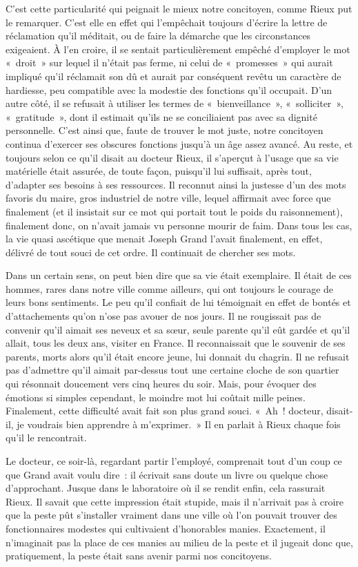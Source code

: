 \documentclass[french,twoside]{book} %
\begin{document}
C’est cette particularité qui peignait le mieux notre concitoyen, comme Rieux put le remarquer. C’est elle en effet qui l’empêchait toujours d’écrire la lettre de réclamation qu’il méditait, ou de faire la démarche que les circonstances exigeaient. À l’en croire, il se sentait particulièrement empêché d’employer le mot « droit » sur lequel il n’était pas ferme, ni celui de « promesses » qui aurait impliqué qu’il réclamait son dû et aurait par conséquent revêtu un caractère de hardiesse, peu compatible avec la modestie des fonctions qu’il occupait. D’un autre côté, il se refusait à utiliser les termes de « bienveillance », « solliciter », « gratitude », dont il estimait qu’ils ne se conciliaient pas avec sa dignité personnelle. C’est ainsi que, faute de trouver le mot juste, notre concitoyen continua d’exercer ses obscures fonctions jusqu’à un âge assez avancé. Au reste, et toujours selon ce qu’il disait au docteur Rieux, il s’aperçut à l’usage que sa vie matérielle était assurée, de toute façon, puisqu’il lui suffisait, après tout, d’adapter ses besoins à ses ressources. Il reconnut ainsi la justesse d’un des mots favoris du maire, gros industriel de notre ville, lequel affirmait avec force que finalement (et il insistait sur ce mot qui portait tout le poids du raisonnement), finalement donc, on n’avait jamais vu personne mourir de faim. Dans tous les cas, la vie quasi ascétique que menait Joseph Grand l’avait finalement, en effet, délivré de tout souci de cet ordre. Il continuait de chercher ses mots.\par
Dans un certain sens, on peut bien dire que sa vie était exemplaire. Il était de ces hommes, rares dans notre ville comme ailleurs, qui ont toujours le courage de leurs bons sentiments. Le peu qu’il confiait de lui témoignait en effet de bontés et d’attachements qu’on n’ose pas avouer de nos jours. Il ne rougissait pas de convenir qu’il aimait ses neveux et sa sœur, seule parente qu’il eût gardée et qu’il allait, tous les deux ans, visiter en France. Il reconnaissait que le souvenir de ses parents, morts alors qu’il était encore jeune, lui donnait du chagrin. Il ne refusait pas d’admettre qu’il aimait par-dessus tout une certaine cloche de son quartier qui résonnait doucement vers cinq heures du soir. Mais, pour évoquer des émotions si simples cependant, le moindre mot lui coûtait mille peines. Finalement, cette difficulté avait fait son plus grand souci. « Ah ! docteur, disait-il, je voudrais bien apprendre à m’exprimer. » Il en parlait à Rieux chaque fois qu’il le rencontrait.\par
Le docteur, ce soir-là, regardant partir l’employé, comprenait tout d’un coup ce que Grand avait voulu dire : il écrivait sans doute un livre ou quelque chose d’approchant. Jusque dans le laboratoire où il se rendit enfin, cela rassurait Rieux. Il savait que cette impression était stupide, mais il n’arrivait pas à croire que la peste pût s’installer vraiment dans une ville où l’on pouvait trouver des fonctionnaires modestes qui cultivaient d’honorables manies. Exactement, il n’imaginait pas la place de ces manies au milieu de la peste et il jugeait donc que, pratiquement, la peste était sans avenir parmi nos concitoyens.
\end{document}
